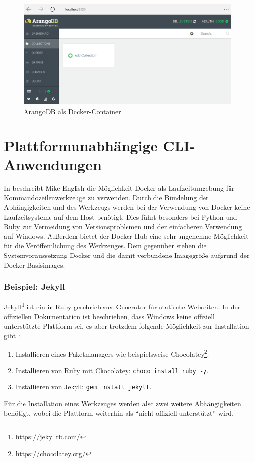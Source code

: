 \begin{figure}[htbp]
    \centering
    \includegraphics[width=0.9\linewidth,clip]{images/arangodb-demo}
    \caption{ArangoDB als Docker-Container}
\label{fig:arangodb-demo}
\end{figure}

\section{Plattformunabhängige CLI-Anwendungen}
\label{sec:cross-platform-applications}
In \autocite{docker-cli-tools:online} beschreibt Mike English die Möglichkeit Docker als Laufzeitumgebung für Kommandozeilenwerkzeuge zu verwenden.
Durch die Bündelung der Abhängigkeiten und des Werkzeugs werden bei der Verwendung von Docker keine Laufzeitsysteme auf dem Host benötigt.
Dies führt besonders bei Python und Ruby zur Vermeidung von Versionsproblemen und der einfacheren Verwendung auf Windows.
Außerdem bietet der Docker Hub eine sehr angenehme Möglichkeit für die Veröffentlichung des Werkzeuges.
Dem gegenüber stehen die Systemvoraussetzung Docker und die damit verbundene Imagegröße aufgrund der Docker-Basisimages.

\subsubsection{Beispiel: Jekyll}
Jekyll\footnote{\url{https://jekyllrb.com/}} ist ein in Ruby geschriebener Generator für statische Webseiten.
In der offiziellen Dokumentation ist beschrieben, dass Windows keine offiziell unterstützte Plattform sei, es aber trotzdem folgende Möglichkeit zur Installation gibt \autocite{jekyll-windows:online}:
\begin{enumerate}
    \item Installieren eines Paketmanagers wie beispielsweise Chocolatey\footnote{\url{https://chocolatey.org/}}.
    \item Installieren von Ruby mit Chocolatey: \texttt{choco install ruby -y}.
    \item Installieren von Jekyll: \texttt{gem install jekyll}.
\end{enumerate}
Für die Installation eines Werkzeuges werden also zwei weitere Abhängigkeiten benötigt, wobei die Plattform weiterhin als "`nicht offiziell unterstützt"' wird.

